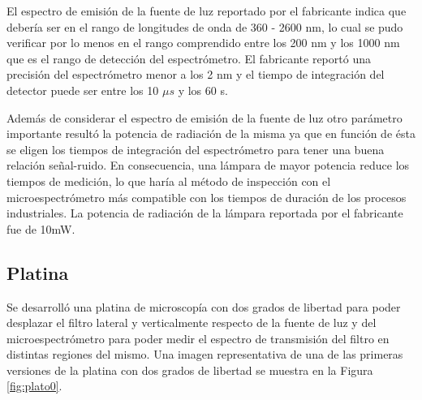 El espectro de emisión de la fuente de luz reportado por el fabricante indica que debería ser en el rango de longitudes de onda de 360 - 2600 nm, lo cual se pudo verificar por lo menos en el rango comprendido entre los 200 nm y los 1000 nm que es el rango de detección del espectrómetro. El fabricante reportó una precisión del espectrómetro menor a los 2 nm y el tiempo de integración del detector puede ser entre los 10 $\mu s$ y los 60 s.

Además de considerar el espectro de emisión de la fuente de luz otro parámetro importante resultó la potencia de radiación de la misma ya que en función de ésta se eligen los tiempos de integración del espectrómetro para tener una buena relación señal-ruido. En consecuencia, una lámpara de mayor potencia reduce los tiempos de medición, lo que haría al método de inspección con el microespectrómetro más compatible con los tiempos de duración de los procesos industriales. La potencia de radiación de la lámpara reportada por el fabricante fue de 10mW. 

\singlespacing
\subsection{Platina \href{https://github.com/jrr1984/open\_frame\_XYStage}{\faGithub} \href{https://github.com/jrr1984/open_frame_XYStage/tree/master/3dprintedparts}{\faCubes}}
\label{sec:platina}

\hspace{0.5cm}Se desarrolló una platina de microscopía con dos grados de libertad para poder desplazar el filtro lateral y verticalmente respecto de la fuente de luz y del microespectrómetro para poder medir el espectro de transmisión del filtro en distintas regiones del mismo. Una imagen representativa de una de las primeras versiones de la platina con dos grados de libertad se muestra en la Figura \ref{fig:plato0}.


